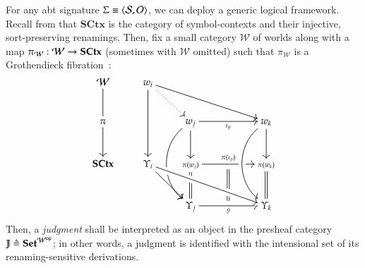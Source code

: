 \documentclass[11pt]{article}
\theoremstyle{definition}
\theoremstyle{remark}
\numberwithin{equation}{section}
\def\IModeColorName{MidnightBlue}
\def\OModeColorName{Maroon}
\def\IModeColorName{Black}
\def\OModeColorName{Black}
\newcommand\IMode[1]{{\color{\IModeColorName}{#1}}}
\newcommand\OMode[1]{{\color{\OModeColorName}{#1}}}
\newcommand\Of[2]{\IMode{#1}: \IMode{#2}}
\newcommand\Match[2]{\IMode{#1}\equiv\OMode{#2}}
\newcommand\Sorts{\mathcal{S}}
\newcommand\Operators{\mathcal{O}}
\newcommand\Sets{\mathbf{Set}}
\newcommand\SCtx{\mathbf{SCtx}}
\newcommand\OpCat[1]{#1^{\mathsf{op}}}
\newcommand\Pair[2]{\left\langle#1, #2 \right\rangle}
\newcommand\Define[2]{\IMode{#1}\triangleq\OMode{#2}}
\begin{document}
For any abt signature $\Match{\Sigma}{\Pair{\Sorts}{\Operators}}$, we can deploy
a generic logical framework. Recall from \cite{sterling-morrison:2015} that
$\SCtx$ is the category of symbol-contexts and their injective, sort-preserving
renamings. Then, fix a small category $\mathcal{W}$ of worlds along with a map
$\Of{\pi_\mathcal{W}}{\mathcal{W}\to\SCtx}$ (sometimes with $\mathcal{W}$
omitted) such that $\pi_\mathcal{W}$ is a Grothendieck
fibration~\cite{jacobs:2001}:
\[
  \begin{tikzcd}[cramped, ampersand replacement = \&, row sep = large]
    {\IMode{\mathcal{W}}}
      \arrow[dash, d]
    \&
    {\IMode{{w}_{i}}}
      \arrow[drrr]
      \arrow[dr, dotted]
      \arrow[dd]
    \&
    {}\&
    {}\&
    {}\\
    {\IMode{{\pi}}}
      \arrow[d]
    \&
    {}\&
    {\OMode{{w}_{j}}}
      \arrow[rr, swap, "\OMode{{\iota}_{\varrho}}"]
      \arrow[dd, bend right = 50]
      \arrow[d]
    \&
    {}\&
    |[alias = Wk]|{\IMode{{w}_{k}}}
      \arrow[d]
    \\
    {\IMode{\SCtx}}\&
    |[alias = Ui]|{\IMode{{\Upsilon}_{i}}}
      \arrow[dr]
    \&
    {\OMode{\scriptstyle{{\pi}({w}_{j})}}}
      \arrow[rr, "\OMode{{\pi}({\iota}_{\varrho})}", ""{name = Msrc, swap}]
      \arrow[equals, d]
    \&
    {}\&
    {\IMode{\scriptstyle{{\pi}({w}_{k})}}}
      \arrow[equals, d]
    \\
    {}\&
    {}\&
    {\IMode{{\Upsilon}_{j}}}
      \arrow[rr, swap, "{\IMode{\varrho}}", ""{name = Mtgt, swap}]
    \&
    {}\&
    |[alias = Uk]|{\IMode{{\Upsilon}_{k}}}
    \arrow[from = Wk, to = Uk, bend right = 50, crossing over]
    \arrow[equals, from = Msrc, to = Mtgt]
    \arrow[from = Ui, to = Uk, crossing over]
  \end{tikzcd}
\]
Then, a \emph{judgment} shall be interpreted as an object in the presheaf
category $\Define{\mathbb{J}}{\Sets^{\OpCat{\mathcal{W}}}}$; in other words, a
judgment is identified with the intensional set of its renaming-sensitive
derivations.
\end{document}
